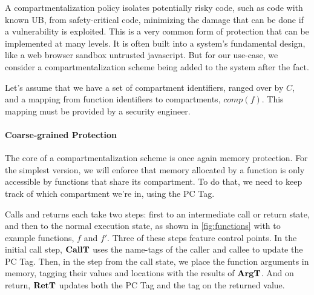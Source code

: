 \documentclass[acmsmall,review,anonymous]{acmart}\settopmatter{printfolios=true,printccs=false,printacmref=false}
\begin{document}
A compartmentalization policy isolates potentially risky code, such as code with known UB,
from safety-critical code, minimizing the damage that can be done if a vulnerability is exploited.
This is a very common form of protection that can be implemented at many levels. It is often built
into a system's fundamental design, like a web browser sandbox untrusted javascript.
But for our use-case, we consider a compartmentalization scheme being added to the system
after the fact.

Let's assume that we have a set of compartment identifiers, ranged over by \(C\), and a mapping
from function identifiers to compartments, \(\mathit{comp}(f)\). This mapping must be provided by
a security engineer.

\paragraph{Coarse-grained Protection}

%
The core of a compartmentalization scheme is once again memory protection. For the simplest version,
we will enforce that memory allocated by a function is only accessible by functions that share its
compartment. To do that, we need to keep track of which compartment we're in, using the PC Tag.

Calls and returns each take two steps: first to an intermediate call or return state, and
then to the normal execution state, as shown in \cref{fig:functions} with to example functions,
\(f\) and \(f'\). Three of these steps feature control points. In the initial call step, \(\mathbf{CallT}\)
uses the name-tags of the caller and callee to update the PC Tag. Then, in the step from the call
state, we place the function arguments in memory, tagging their values and locations with
the results of \(\mathbf{ArgT}\). And on return, \(\mathbf{RetT}\) updates both the PC Tag and
the tag on the returned value.
\end{document}
